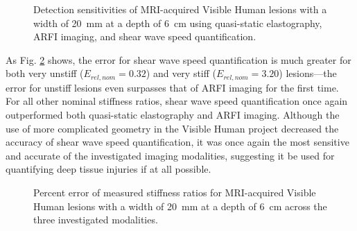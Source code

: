 			\begin{figure}[!htb]
				\centering
				\caption[Detection sensitivities of MRI-acquired Visible Human lesions using the three investigated imaging modalities]{Detection sensitivities of MRI-acquired Visible Human lesions with a width of \SI{20}{\mm} at a depth of \SI{6}{\cm} using quasi-static elastography, ARFI imaging, and shear wave speed quantification.}
				\label{fig:conclusion_human}
			\end{figure}

			As Fig. \ref{fig:conclusions_human_pd} shows, the error for shear wave speed quantification is much greater for both very unstiff ($E_{rel,nom} = 0.32$) and very stiff ($E_{rel,nom} = 3.20$) lesions---the error for unstiff lesions even surpasses that of ARFI imaging for the first time. For all other nominal stiffness ratios, shear wave speed quantification once again outperformed both quasi-static elastography and ARFI imaging. Although the use of more complicated geometry in the Visible Human project decreased the accuracy of shear wave speed quantification, it was once again the most sensitive and accurate of the investigated imaging modalities, suggesting it be used for quantifying deep tissue injuries if at all possible.

			\begin{figure}[!htb]
				\centering
				\caption[Percent error of measured stiffness ratios for MRI-acquired Visible Human lesions across the three investigated modalities]{Percent error of measured stiffness ratios for MRI-acquired Visible Human lesions with a width of \SI{20}{\mm} at a depth of \SI{6}{\cm} across the three investigated modalities.}
				\label{fig:conclusions_human_pd}
			\end{figure}

